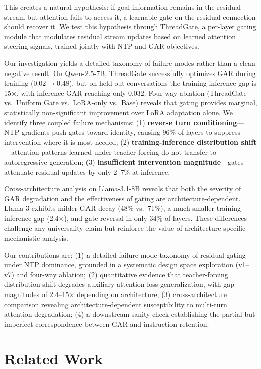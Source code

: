 \documentclass[11pt,a4paper]{article}
\begin{document}
This creates a natural hypothesis: if goal information remains in the residual stream but attention fails to access it, a learnable gate on the residual connection should recover it. We test this hypothesis through ThreadGate, a per-layer gating module that modulates residual stream updates based on learned attention steering signals, trained jointly with NTP and GAR objectives.

Our investigation yields a detailed taxonomy of failure modes rather than a clean negative result. On Qwen-2.5-7B, ThreadGate successfully optimizes GAR during training (0.02$\to$0.48), but on held-out conversations the training-inference gap is 15$\times$, with inference GAR reaching only 0.032. Four-way ablation (ThreadGate vs.\ Uniform Gate vs.\ LoRA-only vs.\ Base) reveals that gating provides marginal, statistically non-significant improvement over LoRA adaptation alone. We identify three coupled failure mechanisms: (1) \textbf{reverse turn conditioning}---NTP gradients push gates toward identity, causing 96\% of layers to suppress intervention where it is most needed; (2) \textbf{training-inference distribution shift}---attention patterns learned under teacher forcing do not transfer to autoregressive generation; (3) \textbf{insufficient intervention magnitude}---gates attenuate residual updates by only 2--7\% at inference.

Cross-architecture analysis on Llama-3.1-8B reveals that both the severity of GAR degradation and the effectiveness of gating are architecture-dependent. Llama-3 exhibits milder GAR decay (48\% vs.\ 71\%), a much smaller training-inference gap (2.4$\times$), and gate reversal in only 34\% of layers. These differences challenge any universality claim but reinforce the value of architecture-specific mechanistic analysis.

Our contributions are: (1) a detailed failure mode taxonomy of residual gating under NTP dominance, grounded in a systematic design space exploration (v1--v7) and four-way ablation; (2) quantitative evidence that teacher-forcing distribution shift degrades auxiliary attention loss generalization, with gap magnitudes of 2.4--15$\times$ depending on architecture; (3) cross-architecture comparison revealing architecture-dependent susceptibility to multi-turn attention degradation; (4) a downstream sanity check establishing the partial but imperfect correspondence between GAR and instruction retention.

\section{Related Work}
\end{document}
